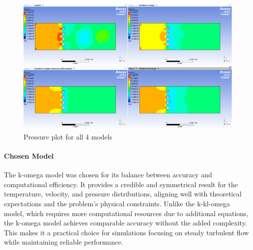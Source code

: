 \begin{figure}[h]   
    \centering
    \includegraphics[width=1\textwidth]{img/Pressure_plot_comparison.png}
    \caption{Pressure plot for all 4 models}
    \label{fig:press_plot}
\end{figure}

\paragraph{Chosen Model}

The k-omega model was chosen for its balance between accuracy and computational efficiency. It provides a credible and symmetrical result for the temperature, velocity, and pressure distributions, aligning well with theoretical expectations and the problem's physical constraints. Unlike the k-kl-omega model, which requires more computational resources due to additional equations, the k-omega model achieves comparable accuracy without the added complexity. This makes it a practical choice for simulations focusing on steady turbulent flow while maintaining reliable performance.


